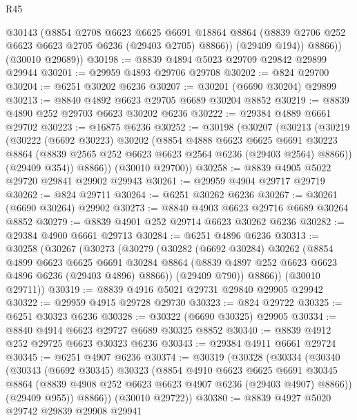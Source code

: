 \begin{lexlean}{R45}
\begin{coremodule}
{            @30143
            (@8854
              @2708
              @6623
              @6625
              @6691
              @18864
              @8864
              (@8839 @2706 @252 @6623 @6623 @2705 @6236 (@29403 @2705) @8866))
            (@29409 @194))
          @8866))
      (@30010 @29689))
@30198 := @8839 @4894 @5023 @29709 @29842 @29899 @29944
@30201 := @29959 @4893 @29706 @29708
@30202 := @824 @29700
@30204 := @6251 @30202 @6236
@30207 := @30201 (@6690 @30204) @29899
@30213 := @8840 @4892 @6623 @29705 @6689 @30204 @8852
@30219 := @8839 @4890 @252 @29703 @6623 @30202 @6236
@30222 := @29384 @4889 @6661 @29702
@30223 := @16875 @6236
@30252 := @30198
    (@30207
      (@30213
        (@30219
          (@30222
            (@6692 @30223)
            @30202
            (@8854
              @4888
              @6623
              @6625
              @6691
              @30223
              @8864
              (@8839 @2565 @252 @6623 @6623 @2564 @6236 (@29403 @2564) @8866))
            (@29409 @354))
          @8866))
      (@30010 @29700))
@30258 := @8839 @4905 @5022 @29720 @29841 @29902 @29943
@30261 := @29959 @4904 @29717 @29719
@30262 := @824 @29711
@30264 := @6251 @30262 @6236
@30267 := @30261 (@6690 @30264) @29902
@30273 := @8840 @4903 @6623 @29716 @6689 @30264 @8852
@30279 := @8839 @4901 @252 @29714 @6623 @30262 @6236
@30282 := @29384 @4900 @6661 @29713
@30284 := @6251 @4896 @6236
@30313 := @30258
    (@30267
      (@30273
        (@30279
          (@30282
            (@6692 @30284)
            @30262
            (@8854
              @4899
              @6623
              @6625
              @6691
              @30284
              @8864
              (@8839 @4897 @252 @6623 @6623 @4896 @6236 (@29403 @4896) @8866))
            (@29409 @790))
          @8866))
      (@30010 @29711))
@30319 := @8839 @4916 @5021 @29731 @29840 @29905 @29942
@30322 := @29959 @4915 @29728 @29730
@30323 := @824 @29722
@30325 := @6251 @30323 @6236
@30328 := @30322 (@6690 @30325) @29905
@30334 := @8840 @4914 @6623 @29727 @6689 @30325 @8852
@30340 := @8839 @4912 @252 @29725 @6623 @30323 @6236
@30343 := @29384 @4911 @6661 @29724
@30345 := @6251 @4907 @6236
@30374 := @30319
    (@30328
      (@30334
        (@30340
          (@30343
            (@6692 @30345)
            @30323
            (@8854
              @4910
              @6623
              @6625
              @6691
              @30345
              @8864
              (@8839 @4908 @252 @6623 @6623 @4907 @6236 (@29403 @4907) @8866))
            (@29409 @955))
          @8866))
      (@30010 @29722))
@30380 := @8839 @4927 @5020 @29742 @29839 @29908 @29941
}
\end{coremodule}
\end{lexlean}
